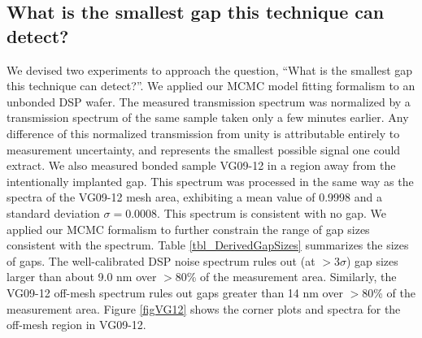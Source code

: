 \subsection{What is the smallest gap this technique can detect?}
We devised two experiments to approach the question, ``What is the smallest gap this technique can detect?''.  We applied our MCMC model fitting formalism to an unbonded DSP wafer.  The measured transmission spectrum was normalized by a transmission spectrum of the same sample taken only a few minutes earlier.  Any difference of this normalized transmission from unity is attributable entirely to measurement uncertainty, and represents the smallest possible signal one could extract.  We also measured bonded sample VG09-12 in a region away from the intentionally implanted gap.  This spectrum was processed in the same way as the spectra of the VG09-12 mesh area, exhibiting a mean value of 0.9998 and a standard deviation $\sigma=0.0008$.  This spectrum is consistent with no gap.  We applied our MCMC formalism to further constrain the range of gap sizes consistent with the spectrum.  Table \ref{tbl_DerivedGapSizes} summarizes the sizes of gaps.  The well-calibrated DSP noise spectrum rules out (at $>3\sigma$) gap sizes larger than about 9.0 nm over $>80$\% of the measurement area.  Similarly, the VG09-12 off-mesh spectrum rules out gaps greater than 14 nm over $>80$\% of the measurement area.  Figure \ref{figVG12} shows the corner plots and spectra for the off-mesh region in VG09-12.


